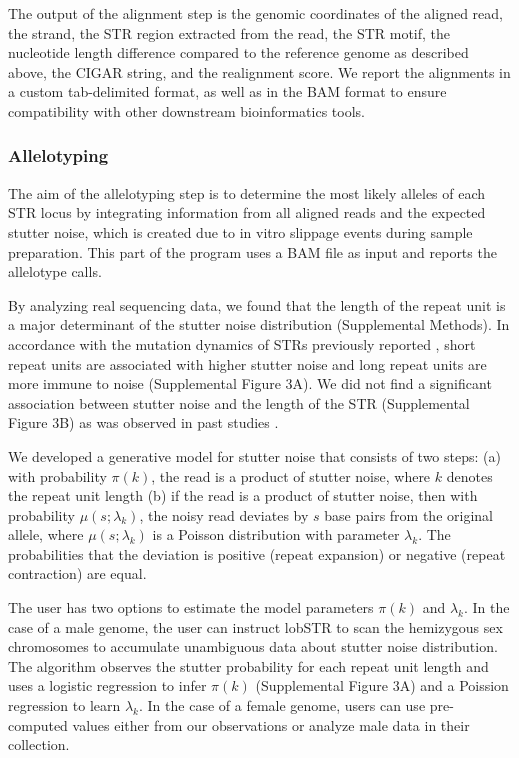 The output of the alignment step is the genomic coordinates of the aligned read, the strand, the STR region extracted from the read, the STR motif, the nucleotide length difference compared to the reference genome as described above, the CIGAR string, and the realignment score. We report the alignments in a custom tab-delimited format, as well as in the BAM format \cite{LiZhaoLinEtAl2009} to ensure compatibility with other downstream bioinformatics tools.

\subsubsection{Allelotyping}
The aim of the allelotyping step is to determine the most likely alleles of each STR locus by integrating information from all aligned reads and the expected stutter noise, which is created due to in vitro slippage events during sample preparation. This part of the program uses a BAM file as input and reports the allelotype calls.

By analyzing real sequencing data, we found that the length of the repeat unit is a major determinant of the stutter noise distribution (Supplemental Methods). In accordance with the mutation dynamics of STRs previously reported \cite{Ellegren2004}, short repeat units are associated with higher stutter noise and long repeat units are more immune to noise (Supplemental Figure 3A). We did not find a significant association between stutter noise and the length of the STR (Supplemental Figure 3B) as was observed in past studies \cite{HaugeLitt1993}.

We developed a generative model for stutter noise that consists of two steps: (a) with probability $\pi(k)$, the read is a product of stutter noise, where $k$ denotes the repeat unit length (b) if the read is a product of stutter noise, then with probability $\mu(s; \lambda_k)$, the noisy read deviates by $s$ base pairs from the original allele, where $\mu(s; \lambda_k)$ is a Poisson distribution with parameter $\lambda_k$. The probabilities that the deviation is positive (repeat expansion) or negative (repeat contraction) are equal. 

The user has two options to estimate the model parameters $\pi(k)$ and $\lambda_k$. In the case of a male genome, the user can instruct lobSTR to scan the hemizygous sex chromosomes to accumulate unambiguous data about stutter noise distribution. The algorithm observes the stutter probability for each repeat unit length and uses a logistic regression to infer $\pi(k)$ (Supplemental Figure 3A) and a Poission regression to learn $\lambda_k$. In the case of a female genome, users can use pre-computed values either from our observations or analyze male data in their collection. 

